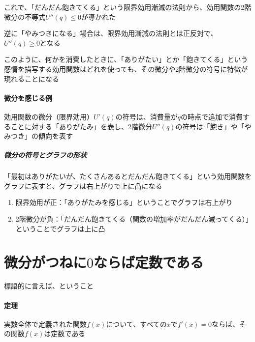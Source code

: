 \documentclass[../book_jiriki_calc]{subfiles}
\begin{document}
\br

これで、「だんだん飽きてくる」という限界効用漸減の法則から、効用関数の2階微分の不等式$U''(q) \leq 0$が導かれた

\br

逆に「やみつきになる」場合は、限界効用漸減の法則とは正反対で、$U''(q) \geq 0$となる

\sectionline

このように、何かを消費したときに、「ありがたい」とか「飽きてくる」という感情を描写する効用関数はどれを使っても、その微分や2階微分の符号に特徴が現れることになる

\br

\paragraph{微分を感じる例}

効用関数の微分（限界効用）$U'(q)$の符号は、消費量が$q$の時点で追加で消費することに対する「ありがたみ」を表し、2階微分$U''(q)$の符号は「飽き」や「やみつき」の傾向を表す

\sectionline

\subparagraph{微分の符号とグラフの形状}

「最初はありがたいが、たくさんあるとだんだん飽きてくる」という効用関数をグラフに表すと、グラフは右上がりで上に凸になる
\begin{enumerate}
  \item 限界効用が正：「ありがたみを感じる」ということでグラフは右上がり
  \item 2階微分が負：「だんだん飽きてくる（関数の増加率がだんだん減ってくる）」ということでグラフは上に凸
\end{enumerate}

\section{微分がつねに$0$ならば定数である}

標語的に言えば、ということ

\sectionline

\paragraph{定理}

実数全体で定義された関数$f(x)$について、すべての$x$で$f'(x)=0$ならば、その関数$f(x)$は定数である

\sectionline
\end{document}

